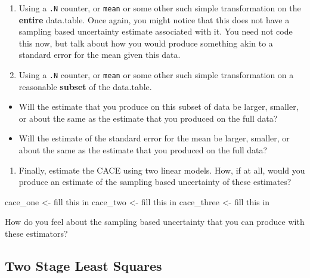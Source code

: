 \documentclass[
]{article}
\newenvironment{Shaded}{\begin{snugshade}}{\end{snugshade}}
\newcommand{\NormalTok}[1]{#1}
\newcommand{\OtherTok}[1]{\textcolor[rgb]{0.56,0.35,0.01}{#1}}
\newcommand{\StringTok}[1]{\textcolor[rgb]{0.31,0.60,0.02}{#1}}
\providecommand{\tightlist}{%
  \setlength{\itemsep}{0pt}\setlength{\parskip}{0pt}}
\begin{document}
\begin{enumerate}
\def\labelenumi{\arabic{enumi}.}
\tightlist
\item
  Using a \texttt{.N} counter, or \texttt{mean} or some other such simple transformation on the \textbf{entire} data.table. Once again, you might notice that this does not have a sampling based uncertainty estimate associated with it. You need not code this now, but talk about how you would produce something akin to a standard error for the mean given this data.
\item
  Using a \texttt{.N} counter, or \texttt{mean} or some other such simple transformation on a reasonable \textbf{subset} of the data.table.
\end{enumerate}

\begin{itemize}
\tightlist
\item
  Will the estimate that you produce on this subset of data be larger, smaller, or about the same as the estimate that you produced on the full data?
\item
  Will the estimate of the standard error for the mean be larger, smaller, or about the same as the estimate that you produced on the full data?
\end{itemize}

\begin{enumerate}
\def\labelenumi{\arabic{enumi}.}
\setcounter{enumi}{2}
\tightlist
\item
  Finally, estimate the CACE using two linear models. How, if at all, would you produce an estimate of the sampling based uncertainty of these estimates?
\end{enumerate}

\begin{Shaded}
\begin{Highlighting}[]
\NormalTok{cace\_one   }\OtherTok{\textless{}{-}} \StringTok{\textquotesingle{}fill this in\textquotesingle{}} 
\NormalTok{cace\_two   }\OtherTok{\textless{}{-}} \StringTok{\textquotesingle{}fill this in\textquotesingle{}} 
\NormalTok{cace\_three }\OtherTok{\textless{}{-}} \StringTok{\textquotesingle{}fill this in\textquotesingle{}} 
\end{Highlighting}
\end{Shaded}

How do you feel about the sampling based uncertainty that you can produce with these estimators?

\hypertarget{two-stage-least-squares}{%
\subsection{Two Stage Least Squares}\label{two-stage-least-squares}}
\end{document}

